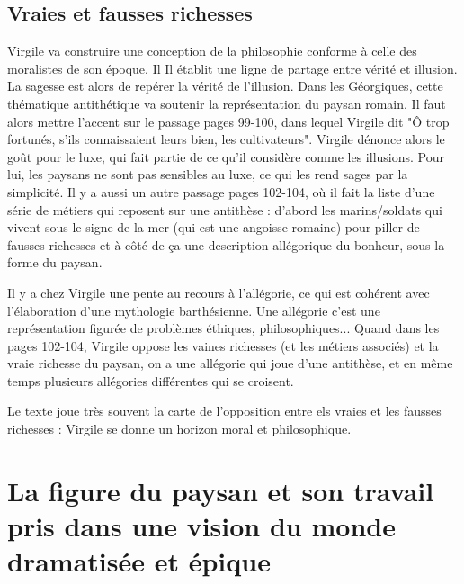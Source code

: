 \documentclass[a4paper,12pt]{book}
\begin{document}
\subsection{Vraies et fausses richesses}
Virgile va construire une conception de la philosophie conforme à celle des moralistes de son époque. Il Il établit une ligne de partage entre vérité et illusion. La sagesse est alors de repérer la vérité de l'illusion. Dans les Géorgiques, cette thématique antithétique va soutenir la représentation du paysan romain. Il faut alors mettre l'accent sur le passage pages 99-100, dans lequel Virgile dit "Ô trop fortunés, s'ils connaissaient leurs bien, les cultivateurs". Virgile dénonce alors le goût pour le luxe, qui fait partie de ce qu'il considère comme les illusions. Pour lui, les paysans ne sont pas sensibles au luxe, ce qui les rend sages par la simplicité. Il y a aussi un autre passage pages 102-104, où il fait la liste d'une série de métiers qui reposent sur une antithèse : d'abord les marins/soldats qui vivent sous le signe de la mer (qui est une angoisse romaine) pour piller de fausses richesses et à côté de ça une description allégorique du bonheur, sous la forme du paysan.
\par Il y a chez Virgile une pente au recours à l'allégorie, ce qui est cohérent avec l'élaboration d'une mythologie barthésienne. Une allégorie c'est une représentation figurée de problèmes éthiques, philosophiques... Quand dans les pages 102-104, Virgile oppose les vaines richesses (et les métiers associés) et la vraie richesse du paysan, on a une allégorie qui joue d'une antithèse, et en même temps plusieurs allégories différentes qui se croisent.
\par Le texte joue très souvent la carte de l'opposition entre els vraies et les fausses richesses : Virgile se donne un horizon moral et philosophique.


\section{La figure du paysan et son travail pris dans une vision du monde dramatisée et épique}
\end{document}
